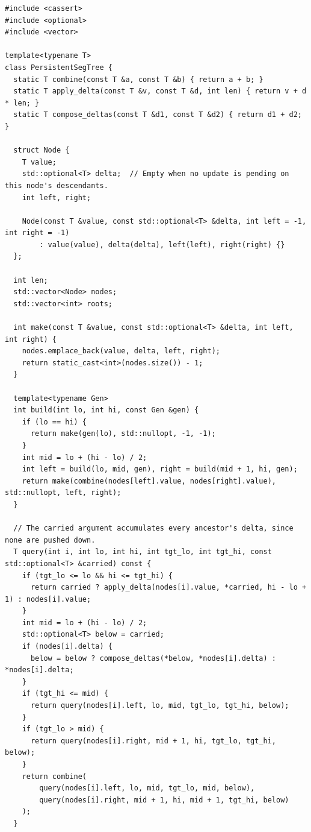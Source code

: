 \begin{lstlisting}[style=cpp]
#include <cassert>
#include <optional>
#include <vector>

template<typename T>
class PersistentSegTree {
  static T combine(const T &a, const T &b) { return a + b; }
  static T apply_delta(const T &v, const T &d, int len) { return v + d * len; }
  static T compose_deltas(const T &d1, const T &d2) { return d1 + d2; }

  struct Node {
    T value;
    std::optional<T> delta;  // Empty when no update is pending on this node's descendants.
    int left, right;

    Node(const T &value, const std::optional<T> &delta, int left = -1, int right = -1)
        : value(value), delta(delta), left(left), right(right) {}
  };

  int len;
  std::vector<Node> nodes;
  std::vector<int> roots;

  int make(const T &value, const std::optional<T> &delta, int left, int right) {
    nodes.emplace_back(value, delta, left, right);
    return static_cast<int>(nodes.size()) - 1;
  }

  template<typename Gen>
  int build(int lo, int hi, const Gen &gen) {
    if (lo == hi) {
      return make(gen(lo), std::nullopt, -1, -1);
    }
    int mid = lo + (hi - lo) / 2;
    int left = build(lo, mid, gen), right = build(mid + 1, hi, gen);
    return make(combine(nodes[left].value, nodes[right].value), std::nullopt, left, right);
  }

  // The carried argument accumulates every ancestor's delta, since none are pushed down.
  T query(int i, int lo, int hi, int tgt_lo, int tgt_hi, const std::optional<T> &carried) const {
    if (tgt_lo <= lo && hi <= tgt_hi) {
      return carried ? apply_delta(nodes[i].value, *carried, hi - lo + 1) : nodes[i].value;
    }
    int mid = lo + (hi - lo) / 2;
    std::optional<T> below = carried;
    if (nodes[i].delta) {
      below = below ? compose_deltas(*below, *nodes[i].delta) : *nodes[i].delta;
    }
    if (tgt_hi <= mid) {
      return query(nodes[i].left, lo, mid, tgt_lo, tgt_hi, below);
    }
    if (tgt_lo > mid) {
      return query(nodes[i].right, mid + 1, hi, tgt_lo, tgt_hi, below);
    }
    return combine(
        query(nodes[i].left, lo, mid, tgt_lo, mid, below),
        query(nodes[i].right, mid + 1, hi, mid + 1, tgt_hi, below)
    );
  }


\end{lstlisting}
